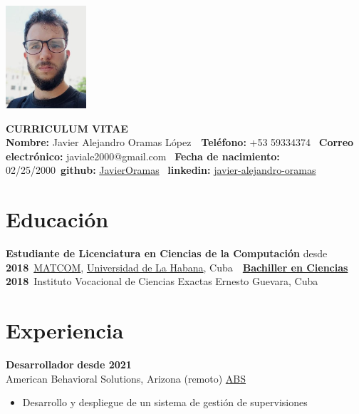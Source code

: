 \documentclass{article}
\begin{document}
\pagestyle{empty} %

\begin{center}
\begin{minipage}[t]{0.2\textwidth}
\vspace{0pt}
\includegraphics[width=3cm]{img.png}
\end{minipage}
\hspace{1cm}
\begin{minipage}[t]{0.7\textwidth}
\vspace{0pt}
\textbf{CURRICULUM VITAE}\\
\textbf{Nombre:} Javier Alejandro Oramas López\
\
\textbf{Teléfono:} +53 59334374 \
\textbf{Correo electrónico:} javiale2000@gmail.com \
\textbf{Fecha de nacimiento:} 02/25/2000\
\textbf{github:} \href{https://github.com/JavierOramas}{JavierOramas} \
\textbf{linkedin:} \href{https://www.linkedin.com/in/javier-alejandro-oramas-l%C3%B3pez-7ab47b160/}{javier-alejandro-oramas} \
\end{minipage}
\end{center}

\section*{Educación}
\textbf{Estudiante de Licenciatura en Ciencias de la Computación} \hfill desde \textbf{2018}\
\href{https://matcom.in/}{MATCOM}, \href{https://uh.cu}{Universidad de La Habana}, Cuba\
\vspace{0.1cm}\
\textbf{\hyperref[sec:bachelor]{Bachiller en Ciencias}} \hfill \textbf{2018}\
Instituto Vocacional de Ciencias Exactas Ernesto Guevara, Cuba

\section*{Experiencia}
    \textbf{Desarrollador} \hfill \textbf{desde 2021}\\ 
    American Behavioral Solutions, Arizona (remoto)
    \href{americanbehavioralsolutions.com}{ABS}
    \begin{itemize}
        \item Desarrollo y despliegue de un sistema de gestión de supervisiones
    \end{itemize}
\end{document}
